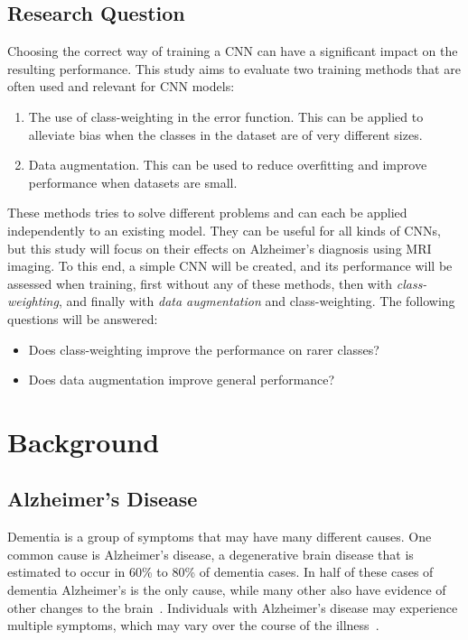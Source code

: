 \documentclass{kththesis}
\begin{document}
\section{Research Question}
Choosing the correct way of training a CNN can have a significant impact on the resulting performance. This study aims to evaluate two training methods that are often used and relevant for CNN models:
\begin{enumerate}
	\item{The use of class-weighting in the error function. This can be applied to alleviate bias when the classes in the dataset are of very different sizes.}
	\item{Data augmentation. This can be used to reduce overfitting and improve performance when datasets are small.}
\end{enumerate}
These methods tries to solve different problems and can each be applied independently to an existing model. They can be useful for all kinds of CNNs, but this study will focus on their effects on Alzheimer's diagnosis using MRI imaging. To this end, a simple CNN will be created, and its performance will be assessed when training, first without any of these methods, then with \textit{class-weighting}, and finally with \textit{data augmentation} and class-weighting. The following questions will be answered:

\begin{itemize}
\item{Does class-weighting improve the performance on rarer classes?}
\item{Does data augmentation improve general performance?}
\end{itemize}

\chapter{Background}

\section{Alzheimer's Disease}

Dementia is a group of symptoms that may have many different causes. One common cause is Alzheimer's disease, a degenerative brain disease that is estimated to occur in 60\% to 80\% of dementia cases. In half of these cases of dementia Alzheimer's is the only cause, while many other also have evidence of other changes to the brain~\cite{factsfigures2018}.
Individuals with Alzheimer's disease may experience multiple symptoms, which may vary over the course of the illness~\cite{factsfigures2018}.
\end{document}
